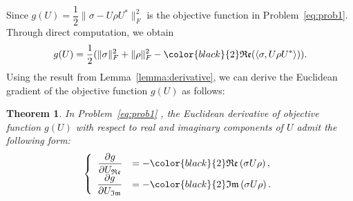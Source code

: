 \documentclass[sn-mathphys-num]{sn-jnl}%
\newcommand{\inner}[1]{\left<#1\right>}
\theoremstyle{thmstyleone}%
\newtheorem{theorem}{Theorem}%
\theoremstyle{thmstyletwo}%
\theoremstyle{thmstylethree}%
\begin{document}
Since $g(U) =\dfrac{1}{2}\displaystyle
\|\sigma - U \rho U^* \|_F^2$ is the objective function in Problem~\ref{eq:prob1}. Through direct computation, we obtain 
\begin{equation}\label{eq:objg}
g(U) = \frac{1}{2}(\|\sigma\|_F^2+\|\rho\|_F^2 - {\color{black}{2}}\mathfrak{Re}(\inner{\sigma, U\rho U^*}) ). 
\end{equation} 
Using the result from Lemma~\ref{lemma:derivative}, we can derive the Euclidean gradient of the objective function $g(U)$ as follows:
\begin{theorem}
    In Problem~\ref{eq:prob1} , the Euclidean derivative of objective function $g(U)$ 
    with respect to real and imaginary components of    
    $U$ admit the following form: 
    {\color{black}
    \begin{equation}\label{eq:par2}
        \left\{
            \begin{array}{rl}
                \dfrac{\partial g}{\partial U_{\mathfrak{Re}}} &=  - {\color{black}{2}}\mathfrak{Re}\left(\sigma U \rho\right),
                \\
                \dfrac{\partial g}{\partial U_{\mathfrak{Im}}} &= - {\color{black}{2}}\mathfrak{Im}\left(\sigma U \rho\right).
            \end{array}
        \right.
    \end{equation}
    }
\end{theorem}
\end{document}
